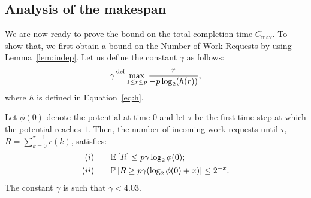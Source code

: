
\subsection{Analysis of the makespan}
\label{gamma}

We are now ready to prove the bound on the total completion time
$C_{\max}$. To show that, we first obtain a bound on the Number of
Work Requests by using Lemma~\ref{lem:indep}.  Let us define the
constant $\gamma$ as follows:
\begin{equation}
  \label{eq:gamma}
  \gamma \mathop{\overset{\mathrm{def}}{=}} \max_{1 \leq r \leq p } \frac{r}{-p \log_2(h(r))},
\end{equation} 
where $h$ is defined in Equation~\eqref{eq:h}.

\begin{lemma}
  \label{lem:OfR}
  Let $\phi(0)$ denote the potential at time $0$ and let $\tau$ be the
  first time step at which the potential reaches $1$.
  Then, the number of incoming work requests until $\tau$,
  $R = \sum_{k=0}^{\tau-1} r(k)$, satisfies:
  \begin{align*}
      (i)\qquad  &\esp{R} \leq p\gamma\log_2\phi(0);  \\
      (ii)\qquad &\Proba{R\ge p\gamma(\log_2\phi(0) + x)} \le {2}^{-x}.
  \end{align*}
  The constant $\gamma$ is such that $\gamma<4.03$.
\end{lemma}

